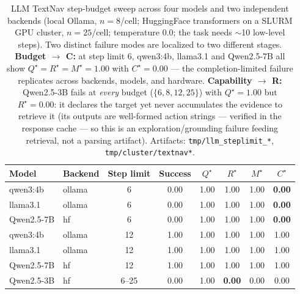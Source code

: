 \documentclass{article}
\begin{document}
\begin{table}[h]
  \caption{LLM TextNav step-budget sweep across four models and two independent backends (local Ollama, $n{=}8$/cell; HuggingFace transformers on a SLURM GPU cluster, $n{=}25$/cell; temperature 0.0; the task needs $\sim$10 low-level steps). Two distinct failure modes are localized to two different stages. \textbf{Budget $\to$ C:} at step limit 6, qwen3:4b, llama3.1 and Qwen2.5-7B all show $Q^\star{=}R^\star{=}M^\star{=}1.00$ with $C^\star{=}0.00$ --- the completion-limited failure replicates across backends, models, and hardware. \textbf{Capability $\to$ R:} Qwen2.5-3B fails at \emph{every} budget ($\{6,8,12,25\}$) with $Q^\star{=}1.00$ but $R^\star{=}0.00$: it declares the target yet never accumulates the evidence to retrieve it (its outputs are well-formed action strings --- verified in the response cache --- so this is an exploration/grounding failure feeding retrieval, not a parsing artifact). Artifacts: \texttt{tmp/llm\_steplimit\_*}, \texttt{tmp/cluster/textnav*}.}
  \label{p1:tab:llm-smoke}
  \centering
  \small
  \begin{tabular}{l l c c c c c c}
    \toprule
    Model & Backend & Step limit & Success & $Q^\star$ & $R^\star$ & $M^\star$ & $C^\star$ \\
    \midrule
    qwen3:4b        & ollama & 6  & 0.00 & 1.00 & 1.00 & 1.00 & \textbf{0.00} \\
    llama3.1        & ollama & 6  & 0.00 & 1.00 & 1.00 & 1.00 & \textbf{0.00} \\
    Qwen2.5-7B      & hf     & 6  & 0.00 & 1.00 & 1.00 & 1.00 & \textbf{0.00} \\
    \midrule
    qwen3:4b        & ollama & 12 & 1.00 & 1.00 & 1.00 & 1.00 & 1.00 \\
    llama3.1        & ollama & 12 & 1.00 & 1.00 & 1.00 & 1.00 & 1.00 \\
    Qwen2.5-7B      & hf     & 12 & 1.00 & 1.00 & 1.00 & 1.00 & 1.00 \\
    \midrule
    Qwen2.5-3B      & hf     & 6--25 & 0.00 & 1.00 & \textbf{0.00} & 0.00 & 0.00 \\
    \bottomrule
  \end{tabular}
\end{table}
\end{document}
